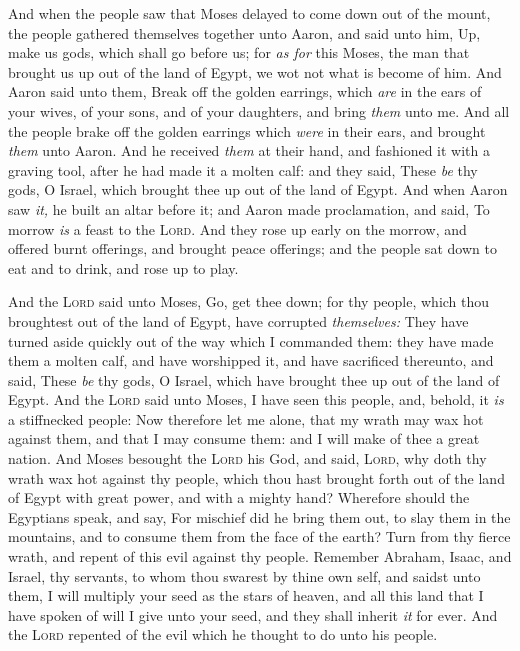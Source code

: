 \documentclass[11pt,letterpaper,oneside]{memoir}
\begin{document}
And when the people saw that Moses delayed to come down out of the
mount, the people gathered themselves together unto Aaron, and said unto
him, Up, make us gods, which shall go before us; for \emph{as for} this
Moses, the man that brought us up out of the land of Egypt, we wot not
what is become of him. And Aaron said unto them, Break off the golden
earrings, which \emph{are} in the ears of your wives, of your sons, and
of your daughters, and bring \emph{them} unto me. And all the people
brake off the golden earrings which \emph{were} in their ears, and
brought \emph{them} unto Aaron. And he received \emph{them} at their
hand, and fashioned it with a graving tool, after he had made it a
molten calf: and they said, These \emph{be} thy gods, O Israel, which
brought thee up out of the land of Egypt. And when Aaron saw \emph{it,}
he built an altar before it; and Aaron made proclamation, and said, To
morrow \emph{is} a feast to the \textsc{Lord}. And they rose up early on
the morrow, and offered burnt offerings, and brought peace offerings;
and the people sat down to eat and to drink, and rose up to play.

And the \textsc{Lord} said unto Moses, Go, get thee down; for thy
people, which thou broughtest out of the land of Egypt, have corrupted
\emph{themselves: }They have turned aside quickly out of the way which I
commanded them: they have made them a molten calf, and have worshipped
it, and have sacrificed thereunto, and said, These \emph{be} thy gods, O
Israel, which have brought thee up out of the land of Egypt. And the
\textsc{Lord} said unto Moses, I have seen this people, and, behold, it
\emph{is} a stiffnecked people: Now therefore let me alone, that my
wrath may wax hot against them, and that I may consume them: and I will
make of thee a great nation. And Moses besought the \textsc{Lord} his
God, and said, \textsc{Lord}, why doth thy wrath wax hot against thy
people, which thou hast brought forth out of the land of Egypt with
great power, and with a mighty hand? Wherefore should the Egyptians
speak, and say, For mischief did he bring them out, to slay them in the
mountains, and to consume them from the face of the earth? Turn from thy
fierce wrath, and repent of this evil against thy people. Remember
Abraham, Isaac, and Israel, thy servants, to whom thou swarest by thine
own self, and saidst unto them, I will multiply your seed as the stars
of heaven, and all this land that I have spoken of will I give unto your
seed, and they shall inherit \emph{it} for ever. And the \textsc{Lord}
repented of the evil which he thought to do unto his people.
\end{document}
